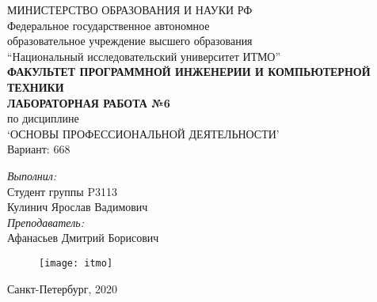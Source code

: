 \begin{center}
МИНИСТЕРСТВО ОБРАЗОВАНИЯ И НАУКИ РФ\\
\hfill \break
Федеральное государственное автономное\\ 
образовательное учреждение высшего образования\\
``Национальный исследовательский университет ИТМО''\\
\hfill \break
\textbf{ФАКУЛЬТЕТ ПРОГРАММНОЙ ИНЖЕНЕРИИ И КОМПЬЮТЕРНОЙ ТЕХНИКИ}\\
\vspace{2.5cm}
\large{\textbf{ЛАБОРАТОРНАЯ РАБОТА №6}}\\
по дисциплине\\
\large{`ОСНОВЫ ПРОФЕССИОНАЛЬНОЙ ДЕЯТЕЛЬНОСТИ'}\\
\hfill \break
Вариант: 668\\
\end{center}

\vspace{8cm}
 
\begin{flushright}
\textit{Выполнил:}\\
Студент группы P3113\\
Кулинич Ярослав Вадимович\\
\textit{Преподаватель:}\\
Афанасьев Дмитрий Борисович\\
\end{flushright}
 
\vfill

\begin{figure}[H]
\centering
\texttt{[image: itmo]}
\end{figure}
\begin{center} Санкт-Петербург, 2020 \end{center}

\thispagestyle{empty}
\newpage